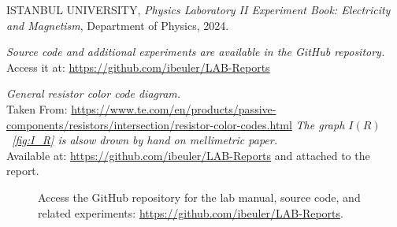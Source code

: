 \documentclass[journal]{IEEEtran}
\begin{document}
\begin{thebibliography}{9}

    ISTANBUL UNIVERSITY, 
    \textit{Physics Laboratory II Experiment Book: Electricity and Magnetism}, 
    Department of Physics, 2024.

    \textit{Source code and additional experiments are available in the GitHub repository.} \\ 
    Access it at: \url{https://github.com/ibeuler/LAB-Reports}

    \textit{General resistor color code diagram.}\\
    Taken From: \url{https://www.te.com/en/products/passive-components/resistors/intersection/resistor-color-codes.html}
    \textit{The graph $I(R)$ ~\ref{fig:I_R} is alsow drown by hand on mellimetric paper.}\\
    Available at: \url{https://github.com/ibeuler/LAB-Reports}
    and attached to the report.
\end{thebibliography}

\begin{figure}[H]
    \centering
    \begin{minipage}{0.15\textwidth}
        \centering
    \end{minipage}%
    \begin{minipage}{0.2\textwidth}
        \raggedright
        \caption{Access the GitHub repository for the lab manual, source code, and related experiments: \href{https://github.com/ibeuler/LAB-Reports}{\url{https://github.com/ibeuler/LAB-Reports}}.}
    \end{minipage}
    \label{fig:qr}
\end{figure}
\end{document}
